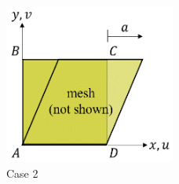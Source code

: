 \begin{figure}[H]
	\centering
	\includegraphics[width=0.5\textwidth]{case2.png}
	\caption{Case 2}
	\label{fig:c2}
\end{figure}